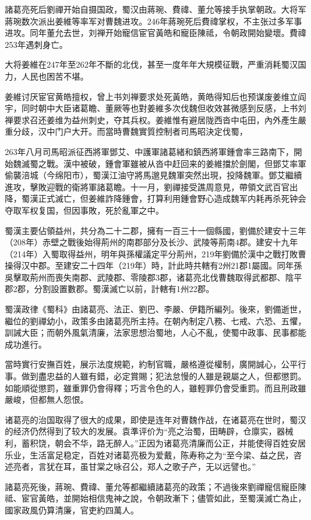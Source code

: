 諸葛亮死后劉禪开始自摄国政，蜀汉由蔣琬、費禕、董允等接手执掌朝政。大将军蔣琬数次派出姜維等率军对曹魏进攻。246年蔣琬死后費禕掌权，不主张过多军事进攻。同年董允去世，刘禅开始寵信宦官黃皓和寵臣陳祗，令朝政開始變壞。費禕253年遇刺身亡。

大将姜維在247年至262年不斷的北伐，甚至一度年年大規模征戰，严重消耗蜀汉国力，人民也困苦不堪。

姜維讨厌宦官黄皓擅权，曾上书刘禅要求处死黃皓，黄皓得知后也预谋废姜维立阎宇，同时朝中大臣诸葛瞻、董厥等也對姜維多次伐魏但收效甚微感到反感，上书刘禅要求召还姜维为益州刺史，夺其兵权。姜維惟有避居陇西沓中屯田，內外產生嚴重分歧，汉中门户大开。而當時曹魏實質控制者司馬昭決定伐蜀，

263年八月司馬昭派征西將軍鄧艾、中護軍諸葛緒和鎮西將軍鍾會率三路南下，開始魏滅蜀之戰。漢中被破，鍾會軍雖被从沓中赶回来的姜維擋於劍閣，但鄧艾率軍偷襲涪城（今绵阳市），蜀漢江油守將馬邈見魏軍突然出現，投降魏軍。鄧艾繼續進攻，擊敗迎戰的衛將軍諸葛瞻。十一月，劉禪接受譙周意見，帶領文武百官出降，蜀漢正式滅亡，但姜維詐降鍾會，打算利用鍾會野心造成魏军内耗再杀死钟会夺取军权复国，但因事敗，死於亂軍之中。

蜀漢主要佔領益州，共分為二十二郡，擁有一百三十一個縣國，劉備於建安十三年（208年）赤壁之戰後始得荊州的南郡部分及长沙、武陵等荊南4郡。建安十九年（214年）入蜀取得益州，明年與孫權議定平分荊州，219年劉備於漢中之戰打敗曹操得汉中郡。至建安二十四年（219年）時，計此時共轄有2州21郡1屬國。同年孫吳擊取荊州而喪失南郡、武陵郡、零陵郡3郡，诸葛亮北伐曹魏取得武都郡、陰平郡2郡，分割設置數郡。蜀漢滅亡以前，計轄有1州22郡。

蜀漢政律《蜀科》由諸葛亮、法正、劉巴、李嚴、伊籍所編列。後來，劉備逝世，繼位的劉禪幼小，政策多由諸葛亮所主持。在朝內制定八務、七戒、六恐、五懼，訓誡大臣；而朝外風氣清廉，法家思想治蜀地，人心不亂，使蜀中政事、民事都能成功進行。

當時實行安撫百姓，展示法度規範，約制官職，嚴格遵從權制，廣開誠心，公平行事。做到盡忠益的人雖有錯，必定賞賜；犯法怠慢的人雖是親屬之人，但都懲罰。如能順從懲罰，雖重罪仍會得釋；巧言令色的人，雖輕罪仍會受重罰。而且刑政雖嚴峻，但都無人怨恨。

诸葛亮的治国取得了很大的成果，即使是连年对曹魏作战，在诸葛亮在世时，蜀汉的经济仍然得到了较大的发展。袁準评价为“亮之治蜀，田畴辟，仓廪实，器械利，蓄积饶，朝会不华，路无醉人。”正因为诸葛亮清廉而公正，并能使得百姓安居乐业，生活富足稳定，百姓对诸葛亮极为爱戴，陈寿称之为“至今梁、益之民，咨述亮者，言犹在耳，虽甘棠之咏召公，郑人之歌子产，无以远譬也。”

諸葛亮死後，蔣琬、費禕、董允等都繼續諸葛亮的政策；不過後來劉禪寵信寵臣陳祗、宦官黃皓，並開始相信鬼神之說，令朝政漸下；儘管如此，至蜀漢滅亡為止，國家政風仍算清廉，官吏約四萬人。

